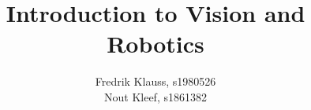 \documentclass[11pt]{homeworg}
\title{Introduction to Vision and Robotics}
\author{
    Fredrik Klauss, s1980526\\
    Nout Kleef, s1861382
}
\begin{document}
\begin{samepage}





\end{samepage}
\end{document}
